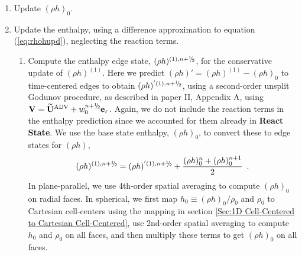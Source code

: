 \begin{description}
\begin{enumerate}
\item Update $(\rho h)_0$.

\item Update the enthalpy, using a difference approximation to
  equation (\ref{eq:rhohupd}), neglecting the reaction terms.

  \begin{enumerate}
  \renewcommand{\labelenumii}{{\bf \roman{enumii}}.}

  \item Compute the enthalpy edge state, $(\rho h)^{(1),\nph}$, for
    the conservative update of $(\rho h)^{(1)}$. Here we predict 
    $(\rho h)' = (\rho h)^{(1)} - (\rho h)_0$
    to time-centered edges to obtain $(\rho h)^{'(1),\nph}$, 
    using a second-order unsplit Godunov procedure, 
    as described in paper II, Appendix A, using $\Vb =
    \uadvtwo+w_0^{\nph} \er$.  Again, we do not include the reaction
    terms in the enthalpy prediction since we accounted for them
    already in {\bf React State}. We use the base state enthalpy,
    $(\rho h)_0$, to convert these to edge states for $(\rho h)$,
\begin{equation}
(\rho h)^{(1),\nph} = 
(\rho h)^{'(1),\nph} + \frac{(\rho h)_0^n + (\rho h)_0^{n+1}}{2} \enskip .
\end{equation}
  In plane-parallel, we use 4th-order spatial averaging to compute $(\rho h)_0$
  on radial faces.  In spherical, we first map $h_0 \equiv (\rho h)_0/\rho_0$ 
  and $\rho_0$ to Cartesian cell-centers using the mapping in section 
  \ref{Sec:1D Cell-Centered to Cartesian Cell-Centered}, use 2nd-order spatial 
  averaging to compute $h_0$ and $\rho_0$ on all faces, and then multiply these 
  terms to get $(\rho h)_0$ on all faces.

\end{enumerate}
\end{enumerate}
\end{description}
